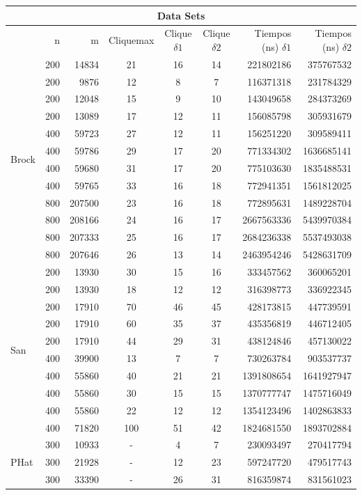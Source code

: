 \begin{tabular}{|l|r|r|c|c|c|r|r|} 
\hline \multicolumn{8}{|c|}{Data Sets} \\
\hline
& n & m & Cliquemax & Clique $\delta1$ & Clique $\delta2$ & Tiempos (ns) $\delta1$ & Tiempos (ns) $\delta2$\\ 
\hline \multirow{12}{*}{Brock} 
& 200 & 14834 & 21& 16& 14 &221802186& 375767532\\
& 200 & 9876& 12& 8& 7&116371318& 231784329\\
& 200& 12048& 15& 9& 10&143049658& 284373269\\
& 200& 13089& 17& 12& 11&156085798& 305931679\\
& 400& 59723& 27& 12& 11&156251220& 309589411\\
& 400& 59786& 29& 17& 20&771334302& 1636685141\\
& 400& 59680& 31& 17& 20&775103630&  1835488531\\
& 400& 59765& 33& 16& 18&772941351& 1561812025\\
& 800& 207500& 23& 16& 18&772895631& 1489228704\\
& 800& 208166& 24& 16& 17&2667563336&  5439970384\\
& 800& 207333& 25& 16& 17&2684236338& 5537493038\\
& 800& 207646& 26& 13& 14&2463954246& 5428631709\\
\hline \multirow{10}{*}{San} 
& 200 & 13930& 30& 15& 16&333457562& 360065201\\
& 200& 13930& 18& 12& 12&316398773& 336922345 \\
& 200& 17910& 70& 46& 45&428173815& 447739591\\
& 200 & 17910& 60& 35& 37&435356819& 446712405 \\
& 200& 17910& 44& 29& 31&438124846&  457130022\\
& 400& 39900& 13& 7& 7&730263784& 903537737\\
& 400& 55860& 40& 21& 21&1391808654& 1641927947\\
& 400& 55860& 30& 15& 15&1370777747& 1475716049\\
& 400& 55860& 22& 12& 12&1354123496& 1402863833\\
& 400& 71820& 100& 51& 42&1824681550& 1893702884\\
\hline \multirow{10}{*}{PHat} 	
& 300& 10933& -& 4&	7&230093497 & 270417794\\
& 300& 21928& -& 12& 23&597247720 & 479517743\\
& 300& 33390& -& 26& 31&816359874 & 831561023 \\

\end{tabular}
